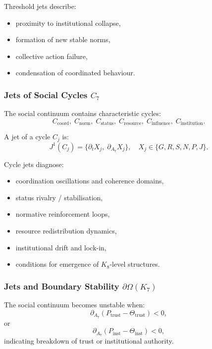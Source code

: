 Threshold jets describe:
\begin{itemize}
    \item proximity to institutional collapse,
    \item formation of new stable norms,
    \item collective action failure,
    \item condensation of coordinated behaviour.
\end{itemize}


\subsubsection{Jets of Social Cycles \texorpdfstring{$C_7$}{C_7}}

The social continuum contains characteristic cycles:
\[
C_{\mathrm{coord}},\;
C_{\mathrm{norm}},\;
C_{\mathrm{status}},\;
C_{\mathrm{resource}},\;
C_{\mathrm{influence}},\;
C_{\mathrm{institution}}.
\]

A jet of a cycle $C_j$ is:
\[
J^1(C_j)
=
\{
\partial_t X_j,\;
\partial_{A_7}X_j
\},
\quad
X_j\in\{G,R,S,N,P,J\}.
\]

Cycle jets diagnose:
\begin{itemize}
    \item coordination oscillations and coherence domains,
    \item status rivalry / stabilisation,
    \item normative reinforcement loops,
    \item resource redistribution dynamics,
    \item institutional drift and lock-in,
    \item conditions for emergence of $K_8$-level structures.
\end{itemize}


\subsubsection{Jets and Boundary Stability \texorpdfstring{$\partial\Omega(K_7)$}{\partial\Omega(K_7)}}

The social continuum becomes unstable when:
\[
\partial_{A_7}(P_{\mathrm{trust}} - \Theta_{\mathrm{trust}}) < 0,
\]
or
\[
\partial_{A_7}(P_{\mathrm{inst}} - \Theta_{\mathrm{inst}}) < 0,
\]
indicating breakdown of trust or institutional authority.

